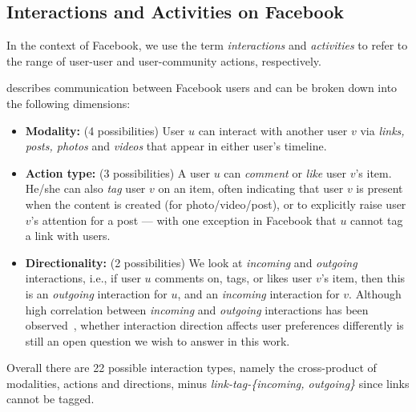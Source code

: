 \subsection{Interactions and Activities on Facebook}

In the context of Facebook, we use the term {\em interactions} and
{\em activities} to refer to the range of user-user and user-community
actions, respectively.

\vspace{2mm}

 describes communication between Facebook users
and can be broken down into the following dimensions:

\begin{itemize}

\item \textbf{Modality:} (4 possibilities) User $u$ can interact with
  another user $v$ via \textit{links, posts, photos} and
  \textit{videos} that appear in either user's timeline.

\item \textbf{Action type:} (3 possibilities) A user $u$ can
  \textit{comment} or \textit{like} user $v$'s item. He/she can also
  \textit{tag} user $v$ on an item, often indicating that user $v$ is
  present when the content is created (for photo/video/post), or to
  explicitly raise user $v$'s attention for a post --- with one
  exception in Facebook that $u$ cannot tag a link with users.

\item \textbf{Directionality:} (2 possibilities) We look at
  \textit{incoming} and \textit{outgoing} interactions, i.e., if user
  $u$ comments on, tags, or likes user $v$'s item, then this is an
  \textit{outgoing} interaction for $u$, and an \textit{incoming} 
  interaction for $v$.
  Although high correlation between \textit{incoming} and
  \textit{outgoing} interactions has been
  observed~\cite{saez2011high}, whether interaction direction affects
  user preferences differently is still an open question we wish to
  answer in this work.

\end{itemize}

Overall there are 22 possible interaction types, namely the cross-product of modalities, actions and directions, minus {\em link-tag-\{incoming, outgoing\}} since links cannot be tagged.

\vspace{2mm}

